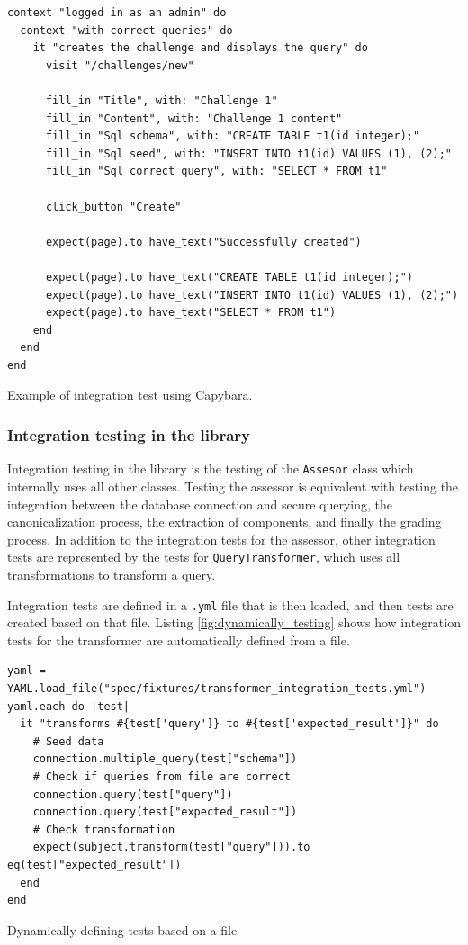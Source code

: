 \begin{code}
\begin{verbatim}
context "logged in as an admin" do
  context "with correct queries" do
    it "creates the challenge and displays the query" do
      visit "/challenges/new"

      fill_in "Title", with: "Challenge 1"
      fill_in "Content", with: "Challenge 1 content"
      fill_in "Sql schema", with: "CREATE TABLE t1(id integer);"
      fill_in "Sql seed", with: "INSERT INTO t1(id) VALUES (1), (2);"
      fill_in "Sql correct query", with: "SELECT * FROM t1"

      click_button "Create"

      expect(page).to have_text("Successfully created")

      expect(page).to have_text("CREATE TABLE t1(id integer);")
      expect(page).to have_text("INSERT INTO t1(id) VALUES (1), (2);")
      expect(page).to have_text("SELECT * FROM t1")
    end
  end
end
\end{verbatim}
\caption{Example of integration test using Capybara.}
\end{code}

\subsubsection{Integration testing in the library} \label{ch:impl:sec:testing:subsec:integ_library}

Integration testing in the library is the testing of the \texttt{Assesor} class which internally uses all other classes. Testing the assessor is equivalent with testing the integration between the database connection and secure querying, the canonicalization process, the extraction of components, and finally the grading process. In addition to the integration tests for the assessor, other integration tests are represented by the tests for \texttt{QueryTransformer}, which uses all transformations to transform a query.

Integration tests are defined in a \texttt{.yml} file that is then loaded, and then tests are created based on that file. Listing \ref{fig:dynamically_testing} shows how integration tests for the transformer are automatically defined from a file.

\begin{code}
\begin{verbatim}
yaml = YAML.load_file("spec/fixtures/transformer_integration_tests.yml")
yaml.each do |test|
  it "transforms #{test['query']} to #{test['expected_result']}" do
    # Seed data
    connection.multiple_query(test["schema"])
    # Check if queries from file are correct
    connection.query(test["query"])
    connection.query(test["expected_result"])
    # Check transformation
    expect(subject.transform(test["query"])).to eq(test["expected_result"])
  end
end
\end{verbatim}
\caption{Dynamically defining tests based on a file}
\label{fig:dynamically_testing}
\end{code}
